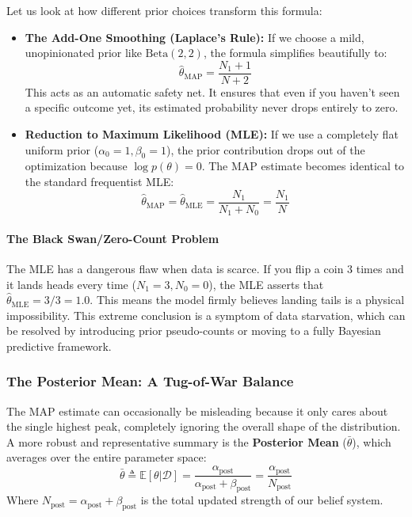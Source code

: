 \documentclass{article}
\begin{document}
Let us look at how different prior choices transform this formula:
\begin{itemize}
    \item \textbf{The Add-One Smoothing (Laplace's Rule):} If we choose a mild, unopinionated prior like $\text{Beta}(2,2)$, the formula simplifies beautifully to:
    \begin{equation}
    \hat{\theta}_{\text{MAP}} = \frac{N_1 + 1}{N + 2}
    \end{equation}
    This acts as an automatic safety net. It ensures that even if you haven't seen a specific outcome yet, its estimated probability never drops entirely to zero.
    \item \textbf{Reduction to Maximum Likelihood (MLE):} If we use a completely flat uniform prior ($\alpha_0 = 1, \beta_0 = 1$), the prior contribution drops out of the optimization because $\log p(\theta) = 0$. The MAP estimate becomes identical to the standard frequentist MLE:
    \begin{equation}
    \hat{\theta}_{\text{MAP}} = \hat{\theta}_{\text{MLE}} = \frac{N_1}{N_1 + N_0} = \frac{N_1}{N}
    \end{equation}
\end{itemize}

\paragraph{The Black Swan/Zero-Count Problem}
The MLE has a dangerous flaw when data is scarce. If you flip a coin $3$ times and it lands heads every time ($N_1 = 3, N_0 = 0$), the MLE asserts that $\hat{\theta}_{\text{MLE}} = 3/3 = 1.0$. This means the model firmly believes landing tails is a physical impossibility. This extreme conclusion is a symptom of data starvation, which can be resolved by introducing prior pseudo-counts or moving to a fully Bayesian predictive framework.

\subsubsection{The Posterior Mean: A Tug-of-War Balance}
The MAP estimate can occasionally be misleading because it only cares about the single highest peak, completely ignoring the overall shape of the distribution. A more robust and representative summary is the \textbf{Posterior Mean} ($\bar{\theta}$), which averages over the entire parameter space:
\begin{equation}
\bar{\theta} \triangleq \mathbb{E}[\theta|\mathcal{D}] = \frac{\alpha_{\text{post}}}{\alpha_{\text{post}} + \beta_{\text{post}}} = \frac{\alpha_{\text{post}}}{N_{\text{post}}}
\end{equation}
Where $N_{\text{post}} = \alpha_{\text{post}} + \beta_{\text{post}}$ is the total updated strength of our belief system.
\end{document}
